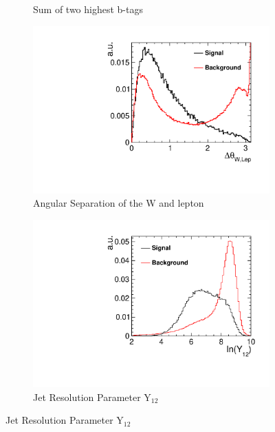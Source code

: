 \begin{figure}[ht]
\begin{subfigure}[b]{0.5\linewidth}
    \caption{Sum of two highest b-tags} 
  \end{subfigure}%
  \begin{subfigure}[b]{0.5\linewidth}
    \centering
    \includegraphics[width=0.75\linewidth]{Appendix/figures/WqqLepAngSep} 
    \caption{Angular Separation of the W and lepton} 
  \end{subfigure}
  \begin{subfigure}[b]{0.5\linewidth}
    \centering
    \includegraphics[width=0.75\linewidth]{Appendix/figures/Y12} 
    \caption{Jet Resolution Parameter Y$_{12}$} 
  \end{subfigure}%
\end{figure}
